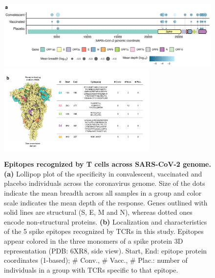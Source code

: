 \begin{figure}[!t]
	\centering
	\includegraphics[width=\textwidth,keepaspectratio]{figures/hits.pdf}
	\includegraphics[width=0.7\textwidth,keepaspectratio]{figures/spike_w_table.pdf}
	\caption{\textbf{Epitopes recognized by T cells across SARS-CoV-2 genome. (a)} Lollipop plot of the \TCRB{} \covid{} specificity in convalescent, vaccinated and placebo individuals across the coronavirus genome. Size of the dots indicate the mean breadth across all samples in a group and color scale indicates the mean depth of the response. Genes outlined with solid lines are structural (S, E, M and N), whereas dotted ones encode non-structural proteins. \textbf{(b)} Localization and characteristics of the 5 \covid{} spike epitopes recognized by TCRs in this study. Epitopes appear colored in the three monomers of a spike protein 3D representation (PDB: 6XR8, side view). Start, End: epitope protein coordinates (1-based); \# Conv., \# Vacc., \# Plac.: number of individuals in a group with TCRs specific to that epitope.}
	\label{fig:hits}
\end{figure}

